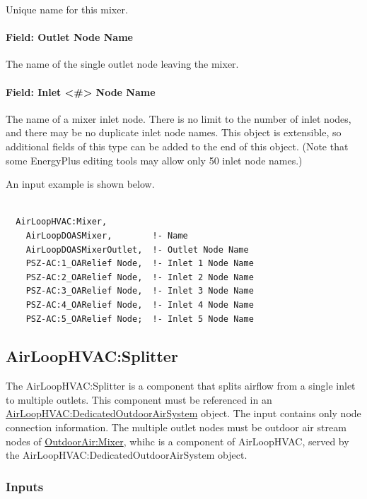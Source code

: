 Unique name for this mixer.

\paragraph{Field: Outlet Node Name}\label{field-outlet-node-name-3}

The name of the single outlet node leaving the mixer.

\paragraph{Field: Inlet \textless{}\#\textgreater{} Node Name}\label{field-inlet-node-name-3}

The name of a mixer inlet node. There is no limit to the number of inlet nodes, and there may be no duplicate inlet node names.  This object is extensible, so additional fields of this type can be added to the end of this object.  (Note that some EnergyPlus editing tools may allow only 50 inlet node names.)

An input example is shown below.

\begin{lstlisting}

  AirLoopHVAC:Mixer,
    AirLoopDOASMixer,        !- Name
    AirLoopDOASMixerOutlet,  !- Outlet Node Name
    PSZ-AC:1_OARelief Node,  !- Inlet 1 Node Name
    PSZ-AC:2_OARelief Node,  !- Inlet 2 Node Name
    PSZ-AC:3_OARelief Node,  !- Inlet 3 Node Name
    PSZ-AC:4_OARelief Node,  !- Inlet 4 Node Name
    PSZ-AC:5_OARelief Node;  !- Inlet 5 Node Name
\end{lstlisting}

\subsection{AirLoopHVAC:Splitter}\label{airloophvacsplitter}

The AirLoopHVAC:Splitter is a component that splits airflow from a single inlet to multiple outlets. This component must be referenced in an \hyperref[airloophvacdedicatedoutdoorairsystem]{AirLoopHVAC:DedicatedOutdoorAirSystem} object. The input contains only node connection information. The multiple outlet nodes must be outdoor air stream nodes of \hyperref[outdoorairmixer]{OutdoorAir:Mixer}, whihc is a component of AirLoopHVAC, served by the AirLoopHVAC:DedicatedOutdoorAirSystem object.

\subsubsection{Inputs}\label{inputs-4-002}

